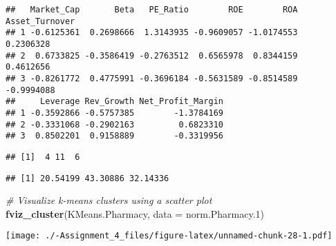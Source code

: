 \documentclass[
]{article}
\newenvironment{Shaded}{\begin{snugshade}}{\end{snugshade}}
\newcommand{\AttributeTok}[1]{\textcolor[rgb]{0.13,0.29,0.53}{#1}}
\newcommand{\CommentTok}[1]{\textcolor[rgb]{0.56,0.35,0.01}{\textit{#1}}}
\newcommand{\ConstantTok}[1]{\textcolor[rgb]{0.56,0.35,0.01}{#1}}
\newcommand{\DecValTok}[1]{\textcolor[rgb]{0.00,0.00,0.81}{#1}}
\newcommand{\FloatTok}[1]{\textcolor[rgb]{0.00,0.00,0.81}{#1}}
\newcommand{\FunctionTok}[1]{\textcolor[rgb]{0.13,0.29,0.53}{\textbf{#1}}}
\newcommand{\NormalTok}[1]{#1}
\newcommand{\SpecialCharTok}[1]{\textcolor[rgb]{0.81,0.36,0.00}{\textbf{#1}}}
\begin{document}
\begin{verbatim}
##   Market_Cap       Beta   PE_Ratio        ROE        ROA Asset_Turnover
## 1 -0.6125361  0.2698666  1.3143935 -0.9609057 -1.0174553      0.2306328
## 2  0.6733825 -0.3586419 -0.2763512  0.6565978  0.8344159      0.4612656
## 3 -0.8261772  0.4775991 -0.3696184 -0.5631589 -0.8514589     -0.9994088
##     Leverage Rev_Growth Net_Profit_Margin
## 1 -0.3592866 -0.5757385        -1.3784169
## 2 -0.3331068 -0.2902163         0.6823310
## 3  0.8502201  0.9158889        -0.3319956
\end{verbatim}

\begin{Shaded}
\end{Shaded}

\begin{verbatim}
## [1]  4 11  6
\end{verbatim}

\begin{Shaded}
\end{Shaded}

\begin{verbatim}
## [1] 20.54199 43.30886 32.14336
\end{verbatim}

\begin{Shaded}
\begin{Highlighting}[]
\CommentTok{\# Visualize k{-}means clusters using a scatter plot}
\FunctionTok{fviz\_cluster}\NormalTok{(KMeans.Pharmacy, }\AttributeTok{data =}\NormalTok{ norm.Pharmacy}\FloatTok{.1}\NormalTok{)}
\end{Highlighting}
\end{Shaded}

\texttt{[image: ./-Assignment\_4\_files/figure-latex/unnamed-chunk-28-1.pdf]}

\begin{Shaded}
\end{Shaded}
\end{document}
